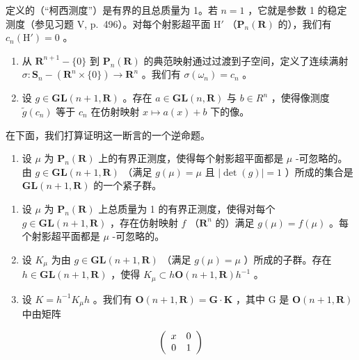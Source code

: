 定义的（“柯西测度”）是有界的且总质量为 1。若 \(n = 1\) ，它就是参数 1 的稳定测度（参见习题 V, p.~496）。对每个射影超平面 \(\mathrm{H}'\) （\(\mathbf{P}_n(\mathbf{R})\) 的），我们有 \(c_n(\mathrm{H}') = 0\) 。

\begin{enumerate}
\def\labelenumi{\alph{enumi})}
\setcounter{enumi}{1}
\item
  从 \(\mathbf{R}^{n+1} - \{0\}\) 到 \(\mathbf{P}_n(\mathbf{R})\) 的典范映射通过过渡到子空间，定义了连续满射 \(\sigma: \mathbf{S}_n - (\mathbf{R}^n \times \{0\}) \to \mathbf{R}^n\) 。我们有 \(\sigma(\omega_n) = c_n\) 。
\item
  设 \(g \in \mathbf{GL}(n+1, \mathbf{R})\) 。存在 \(a \in \mathbf{GL}(n, \mathbf{R})\) 与 \(b \in R^n\) ，使得像测度 \(\widetilde{g}(c_n)\) 等于 \(c_n\) 在仿射映射 \(x \mapsto a(x) + b\) 下的像。
\end{enumerate}

在下面，我们打算证明这一断言的一个逆命题。

\begin{enumerate}
\def\labelenumi{\alph{enumi})}
\setcounter{enumi}{3}
\tightlist
\item
  设 \(\mu\) 为 \(\mathbf{P}_{n}(\mathbf{R})\) 上的有界正测度，使得每个射影超平面都是 \(\mu\) -可忽略的。由 \(g \in \mathbf{GL}(n+1, \mathbf{R})\) （满足 \(g(\mu) = \mu\) 且 \(|\det(g)| = 1\) ）所成的集合是 \(\mathbf{GL}(n+1, \mathbf{R})\) 的一个紧子群。

\end{enumerate}

\begin{enumerate}
\def\labelenumi{\alph{enumi})}
\setcounter{enumi}{4}
\item
  设 \(\mu\) 为 \(\mathbf{P}_n(\mathbf{R})\) 上总质量为 1 的有界正测度，使得对每个 \(g \in \mathbf{GL}(n + 1, \mathbf{R})\) ，存在仿射映射 \(f\) （\(\mathbf{R}^n\) 的）满足 \(g(\mu) = f(\mu)\) 。每个射影超平面都是 \(\mu\) -可忽略的。
\item
  设 \(K_{\mu}\) 为由 \(g \in \mathbf{GL}(n+1, \mathbf{R})\) （满足 \(g(\mu) = \mu\) ）所成的子群。存在 \(h \in \mathbf{GL}(n+1, \mathbf{R})\) ，使得 \(K_{\mu} \subset h \mathbf{O}(n+1, \mathbf{R}) h^{-1}\) 。
\item
  设 \(K = h^{-1}K_{\mu}h\) 。我们有 \(\mathbf{O}(n + 1, \mathbf{R}) = \mathbf{G} \cdot \mathbf{K}\) ，其中 G 是 \(\mathbf{O}(n + 1, \mathbf{R})\) 中由矩阵
\end{enumerate}

\[
\left( \begin{array}{c c} x & 0 \\ 0 & 1 \end{array} \right)
\]

